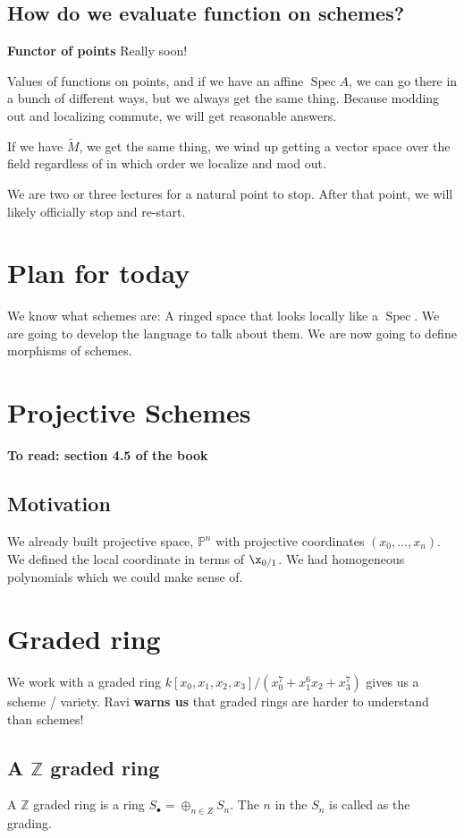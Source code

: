 \documentclass{book}
\newcommand{\Z}{\ensuremath{\mathbb{Z}}}
\renewcommand{\P}{\ensuremath{\mathbb{P}}}
\newcommand{\Spec}{\operatorname{Spec}}
\newcommand{\osum}{\oplus} %
\theoremstyle{definition}
\begin{document}
\subsection{How do we evaluate function on schemes?}

\textbf{Functor of points} Really soon!

Values of functions on points, and if we have an affine $\Spec A$, we can go
there in a bunch of different ways, but we always get the same thing. 
Because modding out and localizing commute, we will get reasonable answers.

If we have $\tilde M$, we get the same thing, we wind up getting a vector
space over the field regardless of in which order we localize and mod out.

We are two or three lectures for a natural point to stop. After that point,
we will likely officially stop and re-start.


\section{Plan for today}
We know what schemes are: A ringed space that looks locally like a $\Spec$. 
We are going to develop the language to talk about them. We are now going to
define morphisms of schemes.

\section{Projective Schemes}
\textbf{To read: section 4.5 of the book}

\subsection{Motivation}
We already built projective space, $\P^n$ with projective coordinates
$(x_0, \dots, x_n)$. We defined the local coordinate in terms of $\x_{0/1}$.
We had homogeneous polynomials which we could make sense of.

\section{Graded ring}
We work with a graded ring $k[x_0, x_1, x_2, x_3] /(x_0^7 + x_1^6 x_2 + x_3^7)$
gives us a scheme / variety. Ravi \textbf{warns us} that graded rings are harder
to understand than schemes!


\subsection{A $\Z$ graded ring}
A $\Z$ graded ring is a ring $S_\bullet = \osum_{n \in Z} S_n$. The $n$ in
the $S_n$ is called as the grading.
\end{document}
